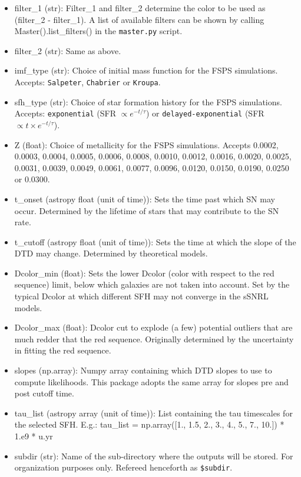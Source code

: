 \documentclass[manuscript]{aastex}
\begin{document}
\begin{itemize}
\item filter\_1 (str): Filter\_1 and filter\_2 determine the color to be used as (filter\_2 - filter\_1). A list of available filters can be shown by calling Master().list\_filters() in the \texttt{master.py} script.
\item filter\_2 (str): Same as above.
\item imf\_type (str): Choice of initial mass function for the FSPS simulations. Accepts: \texttt{Salpeter}, \texttt{Chabrier} or \texttt{Kroupa}.
\item sfh\_type (str): Choice of star formation history for the FSPS simulations. Accepts: \texttt{exponential} (SFR $\propto e^{-t/\tau}$) or \texttt{delayed-exponential} (SFR $\propto t\times e^{-t/\tau}$).
\item Z (float): Choice of metallicity for the FSPS simulations. Accepts 0.0002, 0.0003, 0.0004, 0.0005, 0.0006, 0.0008, 0.0010, 0.0012, 0.0016, 0.0020, 0.0025, 0.0031, 0.0039, 0.0049, 0.0061, 0.0077, 0.0096, 0.0120, 0.0150, 0.0190, 0.0250 or 0.0300.
\item t\_onset (astropy float (unit of time)): Sets the time past which SN may occur. Determined by the lifetime of stars that may contribute to the SN rate.
\item t\_cutoff (astropy float (unit of time)): Sets the time at which the slope of the DTD may change. Determined by theoretical models.
\item Dcolor\_min (float): Sets the lower Dcolor (color with respect to the red sequence) limit, below which galaxies are not taken into account. Set by the typical Dcolor at which different SFH may not converge in the sSNRL models.
\item Dcolor\_max (float): Dcolor cut to explode (a few) potential outliers that are much redder that the red sequence. Originally determined by the uncertainty in fitting the red sequence.
\item slopes (np.array): Numpy array containing which DTD slopes to use to compute likelihoods. This package adopts the same array for slopes pre and post cutoff time.
\item tau\_list (astropy array (unit of time)): List containing the tau timescales for the selected SFH. E.g.: tau\_list = np.array([1., 1.5, 2., 3., 4., 5., 7., 10.]) * 1.e9 * u.yr
\item subdir (str): Name of the sub-directory where the outputs will be stored. For organization purposes only. Refereed henceforth as \texttt{\$subdir}.
\end{itemize}
\end{document}
